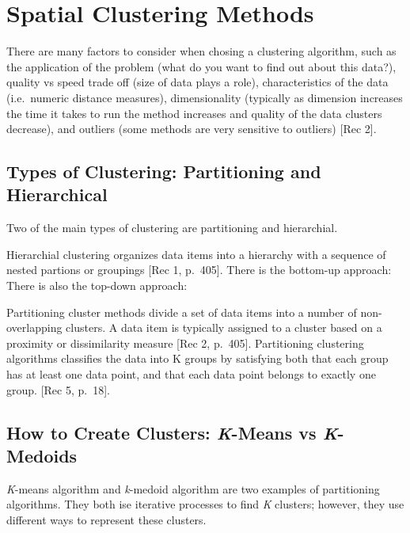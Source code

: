 \documentclass[12pt,twoside]{amherstthesis}
\begin{document}
  \chapter{Spatial Clustering Methods}\label{rmd-basics}
  
  There are many factors to consider when chosing a clustering algorithm,
  such as the application of the problem (what do you want to find out
  about this data?), quality vs speed trade off (size of data plays a
  role), characteristics of the data (i.e.~numeric distance measures),
  dimensionality (typically as dimension increases the time it takes to
  run the method increases and quality of the data clusters decrease), and
  outliers (some methods are very sensitive to outliers) {[}Rec 2{]}.
  
  \section{Types of Clustering: Partitioning and
  Hierarchical}\label{types-of-clustering-partitioning-and-hierarchical}
  
  Two of the main types of clustering are partitioning and hierarchial.
  
  Hierarchial clustering organizes data items into a hierarchy with a
  sequence of nested partions or groupings {[}Rec 1, p.~405{]}. There is
  the bottom-up approach: There is also the top-down approach:
  
  Partitioning cluster methods divide a set of data items into a number of
  non-overlapping clusters. A data item is typically assigned to a cluster
  based on a proximity or dissimilarity measure {[}Rec 2, p.~405{]}.
  Partitioning clustering algorithms classifies the data into K groups by
  satisfying both that each group has at least one data point, and that
  each data point belongs to exactly one group. {[}Rec 5, p.~18{]}.
  
  \section{\texorpdfstring{How to Create Clusters: \emph{K}-Means vs
  \emph{K}-Medoids}{How to Create Clusters: K-Means vs K-Medoids}}\label{how-to-create-clusters-k-means-vs-k-medoids}
  
  \emph{K}-means algorithm and \emph{k}-medoid algorithm are two examples
  of partitioning algorithms. They both ise iterative processes to find
  \emph{K} clusters; however, they use different ways to represent these
  clusters.
  
\end{document}
